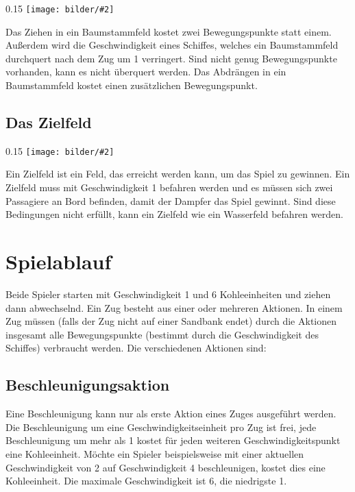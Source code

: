 \documentclass[12pt,a4paper, ngerman, oneside]{scrartcl}
\newcommand{\fieldGraphic}[2]{%
\begin{floatingfigure}[#1]{0.15\textwidth}%
  \centering
  \texttt{[image: bilder/\#2]}%
\end{floatingfigure}%
}
\begin{document}
\fieldGraphic{r}{baumstaemme}

Das Ziehen in ein Baumstammfeld kostet zwei Bewegungspunkte statt einem.
Außerdem wird die Geschwindigkeit eines Schiffes, welches ein Baumstammfeld
durchquert nach dem Zug um 1 verringert. Sind nicht genug Bewegungspunkte
vorhanden, kann es nicht überquert werden. Das Abdrängen in ein Baumstammfeld
kostet einen zusätzlichen Bewegungspunkt.

\paragraph{}

\subsection{\label{goal}Das Zielfeld}

\fieldGraphic{r}{ziel}

Ein Zielfeld ist ein Feld, das erreicht werden kann, um das Spiel zu gewinnen.
Ein Zielfeld muss mit Geschwindigkeit 1 befahren werden und es müssen sich zwei
Passagiere an Bord befinden, damit der Dampfer das Spiel gewinnt. Sind diese
Bedingungen nicht erfüllt, kann ein Zielfeld wie ein Wasserfeld befahren werden.

\paragraph{}

\section{Spielablauf}

Beide Spieler starten mit Geschwindigkeit 1 und 6 Kohleeinheiten und ziehen dann
abwechselnd. Ein Zug besteht aus einer oder mehreren Aktionen. In einem Zug
müssen (falls der Zug nicht auf einer Sandbank endet) durch die Aktionen
insgesamt alle Bewegungspunkte (bestimmt durch die Geschwindigkeit des Schiffes)
verbraucht werden. Die verschiedenen Aktionen sind:


\subsection{\label{acceleration}Beschleunigungsaktion}

Eine Beschleunigung kann nur als erste Aktion eines Zuges ausgeführt werden. Die
Beschleunigung um eine Geschwindigkeitseinheit pro Zug ist frei, jede
Beschleunigung um mehr als 1 kostet für jeden weiteren Geschwindigkeitspunkt
eine Kohleeinheit. Möchte ein Spieler beispielsweise mit einer aktuellen
Geschwindigkeit von 2 auf Geschwindigkeit 4 beschleunigen, kostet dies eine
Kohleeinheit. Die maximale Geschwindigkeit ist 6, die niedrigste 1.
\end{document}
